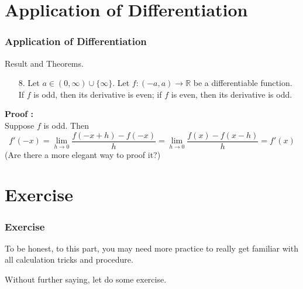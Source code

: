 \documentclass[12pt, t]{beamer}
\begin{document}
\section{Application of Differentiation}
\begin{frame}
    \frametitle{Application of Differentiation}
    Result and Theorems.\\
    \begin{enumerate}
        \item[8.] Let $a\in(0,\infty)\cup\{\infty\}$. Let $f:(-a,a)\rightarrow\mathbb{R}$ be a differentiable function.
            If $f$ is odd, then its derivative is even; if $f$ is even, then its derivative is odd.
    \end{enumerate}

    \textbf{Proof :}\\
    \hspace{1em} Suppose $f$ is odd. Then
    \begin{equation*}
        f'(-x)=\underset{h\rightarrow 0}{\lim}\frac{f(-x+h)-f(-x)}{h}=\underset{h\rightarrow 0}{\lim}\frac{f(x)-f(x-h)}{h}=f'(x)
    \end{equation*}
    (Are there a more elegant way to proof it?)
\end{frame}

\section{Exercise}
\begin{frame}
    \frametitle{Exercise}
    To be honest, to this part, you may need more practice to really get familiar with all calculation tricks and procedure. \\
    \vspace{4em}
    \begin{center}
        \Large Without further saying, let do some exercise.
    \end{center}

\end{frame}
\end{document}
